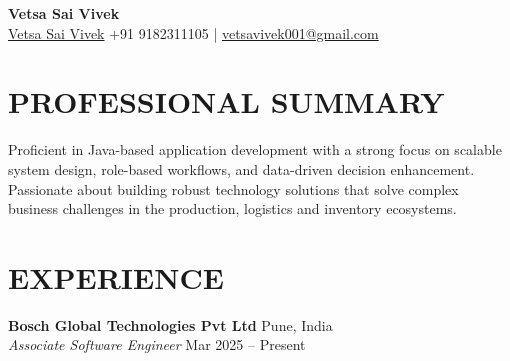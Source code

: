 \documentclass[a4paper,10pt]{article}
\begin{document}
\begin{center}
    {\LARGE \textbf{Vetsa Sai Vivek}}\\
    \vspace{1mm}
    \href{https://www.linkedin.com/in/vetsa-sai-vivek-879281201/}{Vetsa Sai Vivek}
    +91 9182311105 \quad | \quad 
    \href{mailto:vetsavivek001@gmail.com}{vetsavivek001@gmail.com}
    \vspace{1mm}
    
\end{center}

\section*{PROFESSIONAL SUMMARY}
Proficient in Java-based application development with a strong focus on scalable system design, role-based workflows, and data-driven decision enhancement. Passionate about building robust technology solutions that solve complex business challenges in the production, logistics and inventory ecosystems.

\section*{EXPERIENCE}

\textbf{Bosch Global Technologies Pvt Ltd} \hfill Pune, India \\
\vspace{1mm}
\textit{Associate Software Engineer} \hfill Mar 2025 – Present
\end{document}
